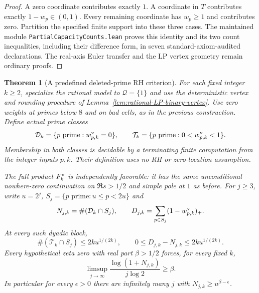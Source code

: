 \documentclass[11pt]{article}
\newtheorem{theorem}{Theorem}[section]
\theoremstyle{definition}
\begin{document}
\begin{proof}
A zero coordinate contributes exactly $1$. A coordinate
in $T$ contributes exactly $1-w_p\in(0,1)$. Every remaining
coordinate has $w_p\ge1$ and contributes zero.
Partition the specified finite support into these three cases.
The maintained module \texttt{PartialCapacityCounts.lean}
proves this identity and its two count inequalities, including
their difference form, in seven standard-axiom-audited
declarations. The real-axis Euler transfer and the LP vertex
geometry remain ordinary proofs.
\end{proof}

\begin{theorem}[A predefined deleted-prime RH criterion]
\label{thm:computable-deleted-prime-RH}
For each fixed integer $k\ge2$, specialize the rational model
to $\mathcal Q=\{1\}$ and use the deterministic vertex and
rounding procedure of
Lemma~\ref{lem:rational-LP-binary-vertex}.
Use zero weights at primes below $8$ and on bad cells,
as in the previous construction. Define actual prime classes
\[
 \mathcal D_k=\{p\text{ prime}:w^{\rm v}_{p,k}=0\},\qquad
 \mathcal T_k=\{p\text{ prime}:0<w^{\rm v}_{p,k}<1\}.
\]
Membership in both classes is decidable by a terminating
finite computation from the integer inputs $p,k$.
Their definition uses no RH or zero-location assumption.

The full product $F_k^{\rm v}$ is independently favorable:
it has the same unconditional nowhere-zero continuation
on $\Re s>1/2$ and simple pole at $1$ as before.
For $j\ge3$, write $u=2^j$,
$S_j=\{p\text{ prime}:u\le p<2u\}$ and
\[
 N_{j,k}=\#(\mathcal D_k\cap S_j),\qquad
 D_{j,k}=\sum_{p\in S_j}(1-w^{\rm v}_{p,k})_+.
\]
At every such dyadic block,
\begin{equation}
 \#(\mathcal T_k\cap S_j)\le2k u^{1/(2k)},\qquad
             0\le D_{j,k}-N_{j,k}\le2k u^{1/(2k)}.
 \label{eq:computed-deleted-prime-counts}
\end{equation}
Every hypothetical zeta zero with real part $\beta>1/2$
forces, for every fixed $k$,
\begin{equation}
 \limsup_{j\to\infty}
       \frac{\log(1+N_{j,k})}{j\log2}\ge\beta.
 \label{eq:deleted-prime-count-zero-readout}
\end{equation}
In particular for every $\epsilon>0$ there are infinitely
many $j$ with $N_{j,k}\ge u^{\beta-\epsilon}$.


\end{theorem}
\end{document}
